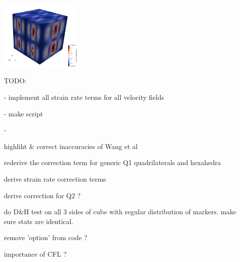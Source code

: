 \begin{itemize}
\includegraphics[width=4cm]{python_codes/fieldstone_31/velfield4}

\end{itemize}




TODO:

- implement all strain rate terms for all velocity fields

- make script  

- 

highliht \& correct inaccuracies of Wang et al

rederive the correction term for generic Q1 quadrilaterals and hexahedra

derive strain rate correction terms

derive correction for Q2 ?

do D\&H test on all 3 sides of cube with regular distribution of markers. make sure stats are identical.

remove 'option' from code ?

importance of CFL ?


